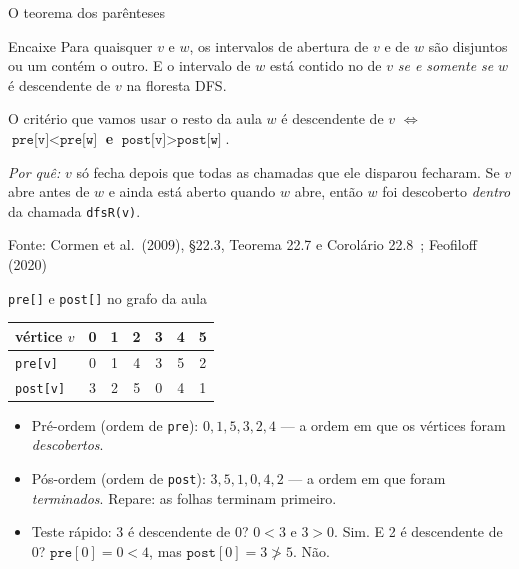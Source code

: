 \documentclass[aspectratio=169]{beamer}
\newcommand{\fonte}[1]{\vfill{\tiny\color{gray!60!black}Fonte: #1\par}}
\begin{document}
\begin{frame}{O teorema dos parênteses}
  \begin{block}{Encaixe}
    {\small Para quaisquer $v$ e $w$, os intervalos de abertura de $v$ e de $w$
    são disjuntos ou um contém o outro. E o intervalo de $w$ está contido no de
    $v$ \emph{se e somente se} $w$ é descendente de $v$ na floresta DFS.}
  \end{block}
  \begin{exampleblock}{O critério que vamos usar o resto da aula}
    {\small $w$ é descendente de $v$ $\iff$
    $\texttt{pre[v]} < \texttt{pre[w]}$ \textbf{e}
    $\texttt{post[v]} > \texttt{post[w]}$.}
  \end{exampleblock}
  {\scriptsize \emph{Por quê:} $v$ só fecha depois que todas as chamadas que ele
  disparou fecharam. Se $v$ abre antes de $w$ e ainda está aberto quando $w$
  abre, então $w$ foi descoberto \emph{dentro} da chamada \texttt{dfsR(v)}.}
  \fonte{Cormen et al.\ (2009), \S 22.3, Teorema 22.7 e Corolário 22.8~\cite{cormen2009introduction}; Feofiloff (2020)~\cite{feofiloff2020algoritmos}}
\end{frame}

\begin{frame}{\texttt{pre[]} e \texttt{post[]} no grafo da aula}
  \begin{center}
  {\small
  \begin{tabular}{lcccccc}
    \toprule
    vértice $v$      & 0 & 1 & 2 & 3 & 4 & 5 \\
    \midrule
    \texttt{pre[v]}  & 0 & 1 & 4 & 3 & 5 & 2 \\
    \texttt{post[v]} & 3 & 2 & 5 & 0 & 4 & 1 \\
    \bottomrule
  \end{tabular}}
  \end{center}
  \medskip
  {\small
  \begin{itemize}\small
    \item Pré-ordem (ordem de \texttt{pre}): $0, 1, 5, 3, 2, 4$ --- a ordem em
          que os vértices foram \emph{descobertos}.
    \item Pós-ordem (ordem de \texttt{post}): $3, 5, 1, 0, 4, 2$ --- a ordem em
          que foram \emph{terminados}. Repare: as folhas terminam primeiro.
    \item Teste rápido: 3 é descendente de 0? $0 < 3$ e $3 > 0$. Sim.
          E 2 é descendente de 0? $\texttt{pre}[0]=0 < 4$, mas
          $\texttt{post}[0]=3 \not> 5$. Não.
  \end{itemize}}
\end{frame}
\end{document}
